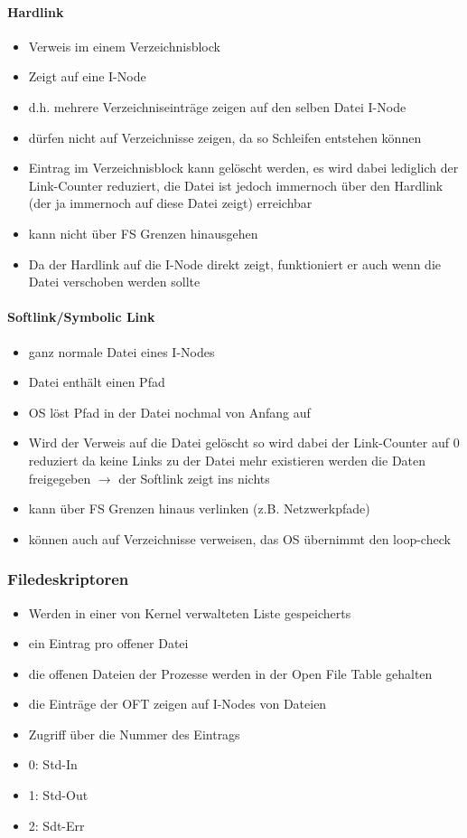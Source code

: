 \documentclass[12pt,a4paper]{article}
\begin{document}
\paragraph{Hardlink}
\flushleft
\begin{itemize}
\item Verweis im einem Verzeichnisblock
\item Zeigt auf eine I-Node
\item d.h. mehrere Verzeichniseinträge zeigen auf den selben Datei I-Node
\item dürfen nicht auf Verzeichnisse zeigen, da so Schleifen entstehen können
\item Eintrag im Verzeichnisblock kann gelöscht werden, es wird dabei lediglich der Link-Counter reduziert, die Datei ist jedoch immernoch über den Hardlink (der ja immernoch auf diese Datei zeigt) erreichbar
\item kann nicht über FS Grenzen hinausgehen
\item Da der Hardlink auf die I-Node direkt zeigt, funktioniert er auch wenn die Datei verschoben werden sollte
\end{itemize}

\paragraph{Softlink/Symbolic Link}
\flushleft
\begin{itemize}
\item ganz normale Datei eines I-Nodes
\item Datei enthält einen Pfad
\item OS löst Pfad in der Datei nochmal von Anfang auf
\item Wird der Verweis auf die Datei gelöscht so wird dabei der Link-Counter auf 0 reduziert da keine Links zu der Datei mehr existieren werden die Daten freigegeben $\rightarrow$ der Softlink zeigt ins nichts
\item kann über FS Grenzen hinaus verlinken (z.B. Netzwerkpfade)
\item können auch auf Verzeichnisse verweisen, das OS übernimmt den loop-check
\end{itemize}

\subsubsection{Filedeskriptoren}
\begin{itemize}
\item Werden in einer von Kernel verwalteten Liste gespeicherts
\item ein Eintrag pro offener Datei
\item die offenen Dateien der Prozesse werden in der Open File Table gehalten
\item die Einträge der OFT zeigen auf I-Nodes von Dateien
\item Zugriff über die Nummer des Eintrags
\item 0: Std-In
\item 1: Std-Out
\item 2: Sdt-Err
\end{itemize}
\end{document}
